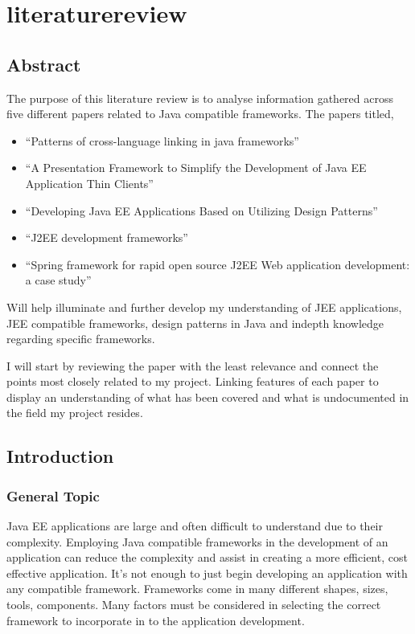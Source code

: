 \chapter{literaturereview}
\section{Abstract}
The purpose of this literature review is to analyse information gathered across five
different papers related to Java compatible frameworks. The papers titled,
\begin{itemize}
	\item “Patterns of cross-language linking in java frameworks”\cite{patterns} 
	\item “A Presentation Framework to Simplify the Development of Java EE Application Thin Clients”\cite{thin}
	\item “Developing Java EE Applications Based on Utilizing Design Patterns”\cite{designpatterns}
	\item “J2EE development frameworks”\cite{j2ee}
	\item “Spring framework for rapid open source J2EE Web application development: a case study”\cite{spring}
	\end{itemize}
	
	Will help illuminate and further develop my understanding of JEE applications, JEE compatible frameworks, design patterns in Java and indepth knowledge regarding specific frameworks.
	
	I will start by reviewing the paper with the least relevance and connect the points most closely related to my project. Linking features of each paper to display an understanding of what has been covered and what is undocumented in the field my project resides.
	
	\section{Introduction}
	
	\subsection{General Topic}
	Java EE applications are large and often difficult to understand due to their complexity. Employing Java compatible frameworks in the development of an application can reduce the complexity and assist in creating a more efficient, cost effective application.
	It’s not enough to just begin developing an application with any compatible framework. Frameworks come in many different shapes, sizes, tools, components. Many factors must be considered in selecting the correct framework to incorporate in to the application development. 
	
